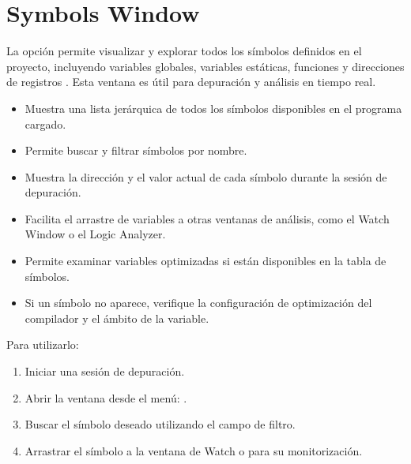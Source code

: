 \documentclass[letterpaper,10pt,english]{sphinxmanual}
\begin{document}
\section{Symbols Window}
\label{\detokenize{cmsis-rtos:symbols-window}}
\sphinxAtStartPar
La opción  permite visualizar y explorar todos los símbolos definidos en el proyecto, incluyendo variables globales, variables estáticas, funciones y direcciones de registros . Esta ventana es útil para depuración y análisis en tiempo real.
\begin{itemize}
\item {} 
\sphinxAtStartPar
Muestra una lista jerárquica de todos los símbolos disponibles en el programa cargado.

\item {} 
\sphinxAtStartPar
Permite buscar y filtrar símbolos por nombre.

\item {} 
\sphinxAtStartPar
Muestra la dirección y el valor actual de cada símbolo durante la sesión de depuración.

\item {} 
\sphinxAtStartPar
Facilita el arrastre de variables a otras ventanas de análisis, como el Watch Window o el Logic Analyzer.

\item {} 
\sphinxAtStartPar
Permite examinar variables optimizadas si están disponibles en la tabla de símbolos.

\item {} 
\sphinxAtStartPar
Si un símbolo no aparece, verifique la configuración de optimización del compilador y el ámbito de la variable.

\end{itemize}

\sphinxAtStartPar
Para utilizarlo:
\begin{enumerate}
%
\item {} 
\sphinxAtStartPar
Iniciar una sesión de depuración.

\item {} 
\sphinxAtStartPar
Abrir la ventana desde el menú: .

\item {} 
\sphinxAtStartPar
Buscar el símbolo deseado utilizando el campo de filtro.

\item {} 
\sphinxAtStartPar
Arrastrar el símbolo a la ventana de Watch o  para su monitorización.

\end{enumerate}
\end{document}
